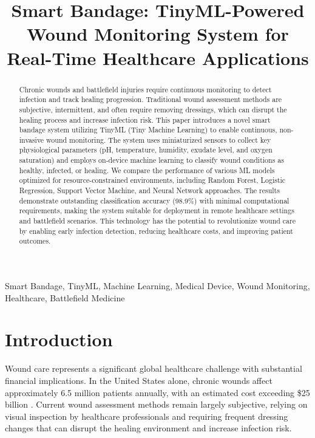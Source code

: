 \documentclass[conference]{IEEEtran}
\begin{document}
\title{Smart Bandage: TinyML-Powered Wound Monitoring System for Real-Time Healthcare Applications}

\author{
}

\maketitle

\begin{abstract}
Chronic wounds and battlefield injuries require continuous monitoring to detect infection and track healing progression. Traditional wound assessment methods are subjective, intermittent, and often require removing dressings, which can disrupt the healing process and increase infection risk. This paper introduces a novel smart bandage system utilizing TinyML (Tiny Machine Learning) to enable continuous, non-invasive wound monitoring. The system uses miniaturized sensors to collect key physiological parameters (pH, temperature, humidity, exudate level, and oxygen saturation) and employs on-device machine learning to classify wound conditions as healthy, infected, or healing. We compare the performance of various ML models optimized for resource-constrained environments, including Random Forest, Logistic Regression, Support Vector Machine, and Neural Network approaches. The results demonstrate outstanding classification accuracy (98.9\%) with minimal computational requirements, making the system suitable for deployment in remote healthcare settings and battlefield scenarios. This technology has the potential to revolutionize wound care by enabling early infection detection, reducing healthcare costs, and improving patient outcomes.
\end{abstract}

\begin{IEEEkeywords}
Smart Bandage, TinyML, Machine Learning, Medical Device, Wound Monitoring, Healthcare, Battlefield Medicine
\end{IEEEkeywords}

\section{Introduction}
Wound care represents a significant global healthcare challenge with substantial financial implications. In the United States alone, chronic wounds affect approximately 6.5 million patients annually, with an estimated cost exceeding \$25 billion \cite{sen2009human}. Current wound assessment methods remain largely subjective, relying on visual inspection by healthcare professionals and requiring frequent dressing changes that can disrupt the healing environment and increase infection risk.
\end{document}
